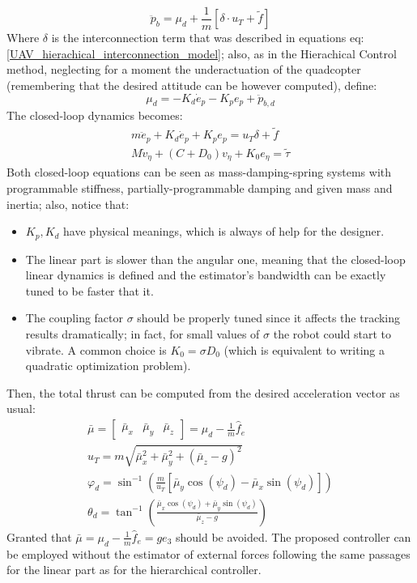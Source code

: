 \begin{equation*}
    \ddot{p}_b=\mu_d+\frac{1}{m}\left[\delta\cdot u_{T}+\tilde{f}\right]
\end{equation*}
Where $\delta$ is the interconnection term that was described in equations eq:\ref{UAV_hierachical_interconnection_model}; also, as in the Hierachical Control method, neglecting for a moment the underactuation of the quadcopter (remembering that the desired attitude can be however computed), define:
\begin{equation*}
    \mu_d=-K_d\dot{e}_p-K_pe_p+\ddot{p}_{b,d}
\end{equation*}
The closed-loop dynamics becomes:
\begin{gather}\label{UAV_passivity_control_closed_loop}
    m\ddot{e}_p+K_d\dot{e}_p+K_pe_p=u_{T}\delta+\tilde{f}\\
    M\dot{v}_\eta+\left(C+D_0\right)v_\eta+K_0e_\eta=\tilde{\tau}
\end{gather}
Both closed-loop equations can be seen as mass-damping-spring systems with programmable stiffness, partially-programmable damping and given mass and inertia; also, notice that:
\begin{itemize}
    \item $K_p,K_d$ have physical meanings, which is always of help for the designer.
    \item The linear part is slower than the angular one, meaning that the closed-loop linear dynamics is defined and the estimator's bandwidth can be exactly tuned to be faster that it.
    \item The coupling factor $\sigma$ should be properly tuned since it affects the tracking results dramatically; in fact, for small values of $\sigma$ the robot could start to vibrate. A common choice is $K_0=\sigma D_0$ (which is equivalent to writing a quadratic optimization problem).
\end{itemize}
Then, the total thrust can be computed from the desired acceleration vector as usual:
\begin{gather*}
    \bar{\mu}=\begin{bmatrix}
        \bar{\mu}_{x} & \bar{\mu}_{y} & \bar{\mu}_{z}
    \end{bmatrix}=
    \mu_{d}-\frac{1}{m}\hat{f}_{e}\\
    u_{T}=m\sqrt{\bar{\mu}^{2}_{x}+\bar{\mu}^{2}_{y}+\left(\bar{\mu}_{z}-g\right)^{2}}\\
    \varphi_{d}=\sin^{-1}\left(\frac{m}{u_{T}}\left[\bar{\mu}_{y}\cos(\psi_{d})-\bar{\mu}_{x}\sin(\psi_{d})\right]\right)\\
    \theta_{d}=\tan^{-1}\left(\frac{\bar{\mu}_{x}\cos(\psi_{d})+\bar{\mu}_{y}\sin(\psi_{d})}{\bar{\mu}_{z}-g}\right)
\end{gather*}
Granted that $\bar{\mu}=\mu_{d}-\frac{1}{m}\hat{f}_{e}=ge_{3}$ should be avoided. The proposed controller can be employed without the estimator of external forces following the same passages for the linear part as for the hierarchical controller.
